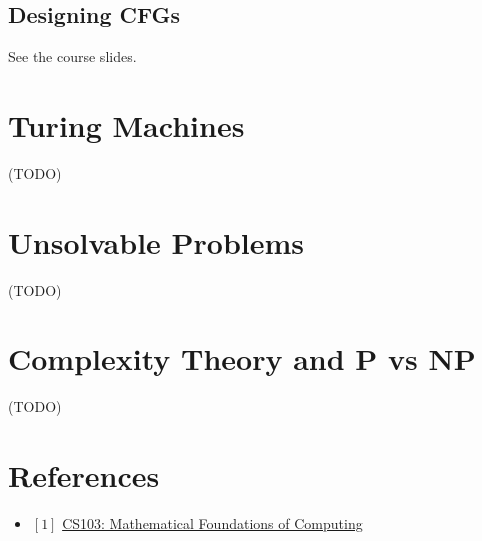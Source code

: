 \documentclass[12pt, letterpaper, oneside]{book}
\begin{document}
\section{Designing CFGs}

See the course slides.

%
%

\chapter{Turing Machines}

 (TODO)

%
%

\chapter{Unsolvable Problems}

 (TODO)

%
%

\chapter{Complexity Theory and P vs NP}

 (TODO)

\chapter*{References}

\begin{itemize}
  \item $[1]$ \href{https://web.stanford.edu/class/cs103/}{CS103: Mathematical Foundations of Computing}
\end{itemize}
\end{document}
